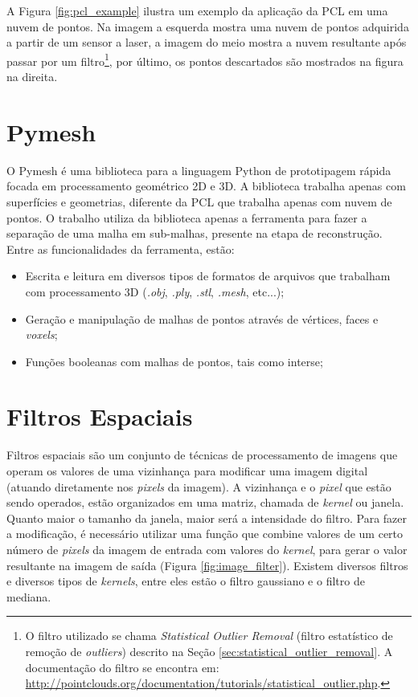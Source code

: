 A Figura \ref{fig:pcl_example} ilustra um exemplo da aplicação da PCL em uma nuvem de pontos. Na imagem a esquerda mostra uma nuvem de pontos adquirida a partir de um sensor a laser, a imagem do meio mostra a nuvem resultante após passar por um filtro\footnote{O filtro utilizado se chama \textit{Statistical Outlier Removal} (filtro estatístico de remoção de \textit{outliers}) descrito na Seção \ref{sec:statistical_outlier_removal}. A documentação do filtro se encontra em: \url{http://pointclouds.org/documentation/tutorials/statistical_outlier.php}.}, por último, os pontos descartados são mostrados na figura na direita.

\section{Pymesh}
\label{sec:pymesh}
O Pymesh é uma biblioteca para a linguagem Python de prototipagem rápida focada em processamento geométrico 2D e 3D. 
A biblioteca trabalha apenas com superfícies e geometrias, diferente da PCL que trabalha apenas com nuvem de pontos. 
O trabalho utiliza da biblioteca apenas a ferramenta para fazer a separação de uma malha em sub-malhas, presente na etapa de reconstrução.
Entre as funcionalidades da ferramenta, estão: 

\vspace{0.5em}
\begin{itemize}
    \item Escrita e leitura em diversos tipos de formatos de arquivos que trabalham com processamento 3D (\textit{.obj}, \textit{.ply}, \textit{.stl}, \textit{.mesh}, etc...);
    \item Geração e manipulação de malhas de pontos através de vértices, faces e \textit{voxels};
    \item Funções booleanas com malhas de pontos, tais como interse;
\end{itemize}
\vspace{1em}


\iffalse
\section{Filtros Espaciais}
Filtros espaciais são um conjunto de técnicas de processamento de imagens que operam os valores de uma vizinhança para modificar uma imagem digital (atuando diretamente nos \textit{pixels} da imagem). 
A vizinhança e o \textit{pixel} que estão sendo operados, estão organizados em uma matriz, chamada de \textit{kernel} ou janela. 
Quanto maior o tamanho da janela, maior será a intensidade do filtro.
Para fazer a modificação, é necessário utilizar uma função que combine valores de um certo número de \textit{pixels} da imagem de entrada com valores do \textit{kernel}, para gerar o valor resultante na imagem de saída (Figura \ref{fig:image_filter}).
Existem diversos filtros e diversos tipos de \textit{kernels}, entre eles estão o filtro gaussiano e o filtro de mediana.

